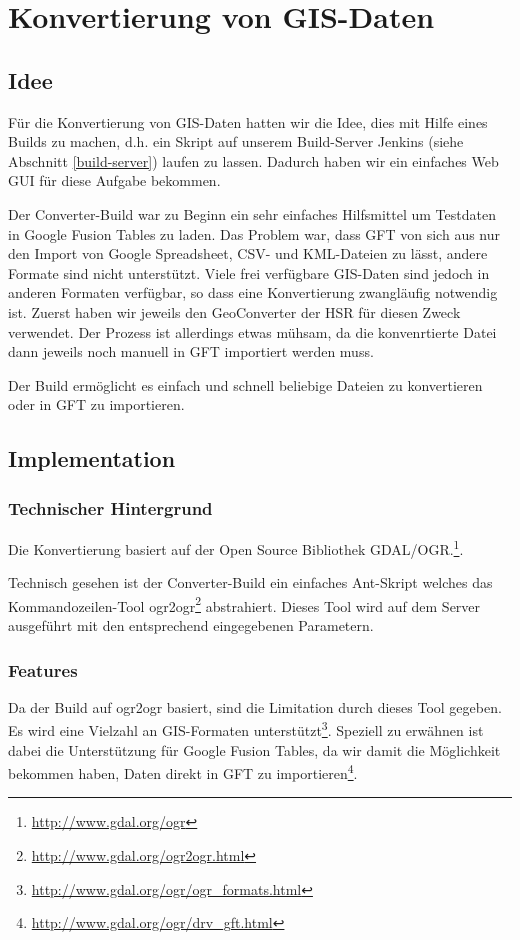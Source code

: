 \chapter{Konvertierung von GIS-Daten}
\label{converter-build}

\section{Idee}
Für die Konvertierung von GIS-Daten hatten wir die Idee, dies mit Hilfe eines Builds zu machen, d.h. ein Skript auf unserem Build-Server Jenkins (siehe Abschnitt \ref{build-server}) laufen zu lassen. Dadurch haben wir ein einfaches Web GUI für diese Aufgabe bekommen.

Der Converter-Build war zu Beginn ein sehr einfaches Hilfsmittel um Testdaten in Google Fusion Tables zu laden. Das Problem war, dass GFT von sich aus nur den Import von Google Spreadsheet, \gls{CSV}- und \gls{KML}-Dateien zu lässt, andere Formate sind nicht unterstützt. Viele frei verfügbare \gls{GIS}-Daten sind jedoch in anderen Formaten verfügbar, so dass eine Konvertierung zwangläufig notwendig ist. Zuerst haben wir jeweils den GeoConverter der HSR für diesen Zweck verwendet. Der Prozess ist allerdings etwas mühsam, da die konvenrtierte Datei dann jeweils noch manuell in GFT importiert werden muss.

Der Build ermöglicht es einfach und schnell beliebige Dateien zu konvertieren oder in GFT zu importieren.

\section{Implementation}
\subsection{Technischer Hintergrund}
Die Konvertierung basiert auf der Open Source Bibliothek GDAL/OGR.\footnote{\url{http://www.gdal.org/ogr}}.

Technisch gesehen ist der Converter-Build ein einfaches Ant-Skript welches das Kommandozeilen-Tool ogr2ogr\footnote{\url{http://www.gdal.org/ogr2ogr.html}} abstrahiert. Dieses Tool wird auf dem Server ausgeführt mit den entsprechend eingegebenen Parametern. 

\subsection{Features}
Da der Build auf ogr2ogr basiert, sind die Limitation durch dieses Tool gegeben. Es wird eine Vielzahl an \gls{GIS}-Formaten unterstützt\footnote{\url{http://www.gdal.org/ogr/ogr_formats.html}}. Speziell zu erwähnen ist dabei die Unterstützung für Google Fusion Tables, da wir damit die Möglichkeit bekommen haben, Daten direkt in GFT zu importieren\footnote{\url{http://www.gdal.org/ogr/drv_gft.html}}.

